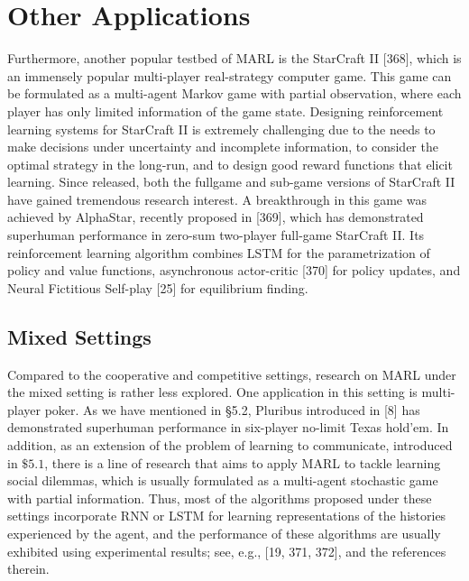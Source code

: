 \documentclass[10pt]{article}
\begin{document}
\section{Other Applications}
Furthermore, another popular testbed of MARL is the StarCraft II [368], which is an immensely popular multi-player real-strategy computer game. This game can be formulated as a multi-agent Markov game with partial observation, where each player has only limited information of the game state. Designing reinforcement learning systems for StarCraft II is extremely challenging due to the needs to make decisions under uncertainty and incomplete information, to consider the optimal strategy in the long-run, and to design good reward functions that elicit learning. Since released, both the fullgame and sub-game versions of StarCraft II have gained tremendous research interest. A breakthrough in this game was achieved by AlphaStar, recently proposed in [369], which has demonstrated superhuman performance in zero-sum two-player full-game StarCraft II. Its reinforcement learning algorithm combines LSTM for the parametrization of policy and value functions, asynchronous actor-critic [370] for policy updates, and Neural Fictitious Self-play [25] for equilibrium finding.

\subsection{Mixed Settings}
Compared to the cooperative and competitive settings, research on MARL under the mixed setting is rather less explored. One application in this setting is multi-player poker. As we have mentioned in §5.2, Pluribus introduced in [8] has demonstrated superhuman performance in six-player no-limit Texas hold'em. In addition, as an extension of the problem of learning to communicate, introduced in $\$ 5.1$, there is a line of research that aims to apply MARL to tackle learning social dilemmas, which is usually formulated as a multi-agent stochastic game with partial information. Thus, most of the algorithms proposed under these settings incorporate RNN or LSTM for learning representations of the histories experienced by the agent, and the performance of these algorithms are usually exhibited using experimental results; see, e.g., [19, 371, 372], and the references therein.
\end{document}
